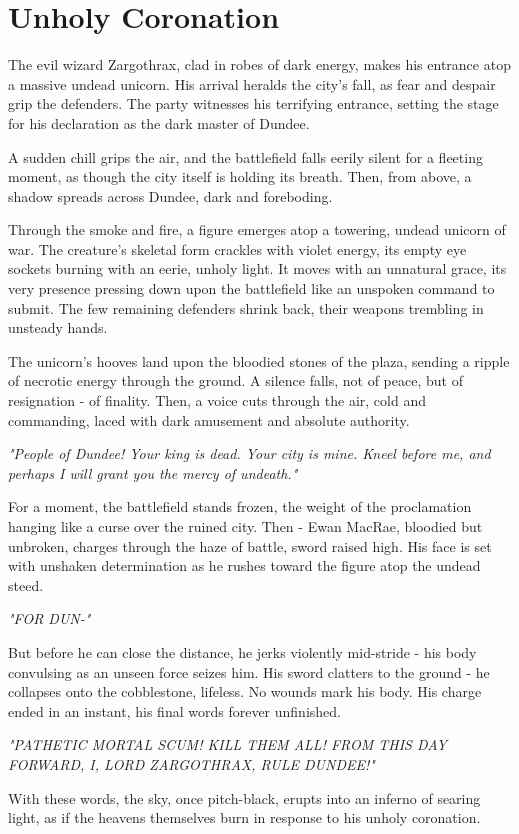 \section*{Unholy Coronation}
{\entryfont The evil wizard Zargothrax, clad in robes of dark energy, makes his entrance atop a massive undead unicorn. His arrival heralds the city's fall, as fear and despair grip the defenders. The party witnesses his terrifying entrance, setting the stage for his declaration as the dark master of Dundee.}
\begin{DndReadAloud}
	A sudden chill grips the air, and the battlefield falls eerily silent for a fleeting moment, as though the city itself is holding its breath. Then, from above, a shadow spreads across Dundee, dark and foreboding.
	
	Through the smoke and fire, a figure emerges atop a towering, undead unicorn of war. The creature's skeletal form crackles with violet energy, its empty eye sockets burning with an eerie, unholy light. It moves with an unnatural grace, its very presence pressing down upon the battlefield like an unspoken command to submit. The few remaining defenders shrink back, their weapons trembling in unsteady hands.

	The unicorn's hooves land upon the bloodied stones of the plaza, sending a ripple of necrotic energy through the ground. A silence falls, not of peace, but of resignation - of finality. Then, a voice cuts through the air, cold and commanding, laced with dark amusement and absolute authority.

	\textit{"People of Dundee! Your king is dead. Your city is mine. Kneel before me, and perhaps I will grant you the mercy of undeath."}
	
	For a moment, the battlefield stands frozen, the weight of the proclamation hanging like a curse over the ruined city. Then - Ewan MacRae, bloodied but unbroken, charges through the haze of battle, sword raised high. His face is set with unshaken determination as he rushes toward the figure atop the undead steed.
	
	\textit{"FOR DUN-"}
	
	But before he can close the distance, he jerks violently mid-stride - his body convulsing as an unseen force seizes him. His sword clatters to the ground - he collapses onto the cobblestone, lifeless. No wounds mark his body. His charge ended in an instant, his final words forever unfinished.
	
	\textit{"PATHETIC MORTAL SCUM! KILL THEM ALL! FROM THIS DAY FORWARD, I, LORD ZARGOTHRAX, RULE DUNDEE!"}
	
	With these words, the sky, once pitch-black, erupts into an inferno of searing light, as if the heavens themselves burn in response to his unholy coronation.
\end{DndReadAloud}

